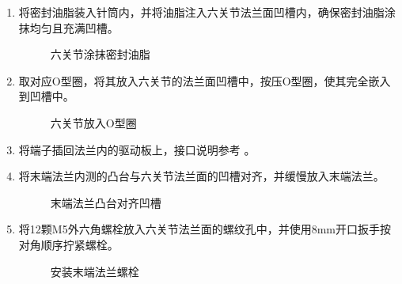 \documentclass[a4paper,11pt,english,openany,oneside]{sphinxmanual}
\begin{document}
\sphinxAtStartPar
{}
\begin{enumerate}
%
\item {} 
\sphinxAtStartPar
将密封油脂装入针筒内，并将油脂注入六关节法兰面凹槽内，确保密封油脂涂抹均匀且充满凹槽。

\begin{figure}[H]
\centering
\capstart

\noindent{}
\caption{六关节涂抹密封油脂}\label{\detokenize{_u66f4_u6362_u672b_u7aef_u6cd5_u5170:id28}}\end{figure}

\item {} 
\sphinxAtStartPar
取对应O型圈，将其放入六关节的法兰面凹槽中，按压O型圈，使其完全嵌入到凹槽中。

\begin{figure}[H]
\centering
\capstart

\noindent{}
\caption{六关节放入O型圈}\label{\detokenize{_u66f4_u6362_u672b_u7aef_u6cd5_u5170:id29}}\end{figure}

\item {} 
\sphinxAtStartPar
将端子插回法兰内的驱动板上，接口说明参考 {\hyperref[\detokenize{_u66f4_u6362_u672b_u7aef_u6cd5_u5170:id3}]{}} 。

\item {} 
\sphinxAtStartPar
将末端法兰内测的凸台与六关节法兰面的凹槽对齐，并缓慢放入末端法兰。

\begin{figure}[H]
\centering
\capstart

\noindent{}
\caption{末端法兰凸台对齐凹槽}\label{\detokenize{_u66f4_u6362_u672b_u7aef_u6cd5_u5170:id30}}\end{figure}

\item {} 
\sphinxAtStartPar
将12颗M5外六角螺栓放入六关节法兰面的螺纹孔中，并使用8mm开口扳手按对角顺序拧紧螺栓。

\begin{figure}[H]
\centering
\capstart

\noindent{}
\caption{安装末端法兰螺栓}\label{\detokenize{_u66f4_u6362_u672b_u7aef_u6cd5_u5170:id31}}\end{figure}


\end{enumerate}
\end{document}
